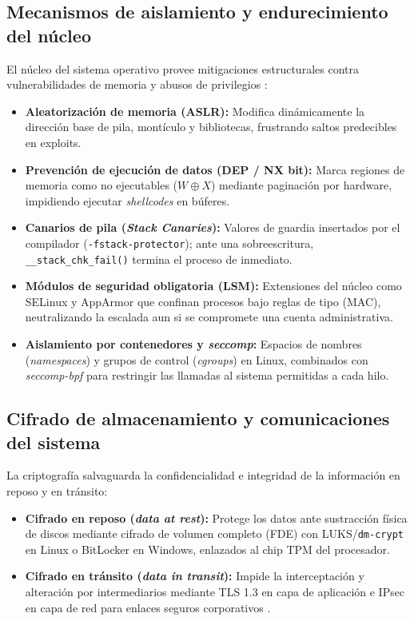 \documentclass[12pt]{article}
\begin{document}
\subsection{Mecanismos de aislamiento y endurecimiento del núcleo}\label{subsec:aislamientoEndurecimientoNucleo}

El núcleo del sistema operativo provee mitigaciones estructurales contra vulnerabilidades de memoria y abusos de privilegios \parencite[\S 15.5, p.\ 683]{stallings2018operating}:
\begin{itemize}[noitemsep, topsep=2pt]
    \item \textbf{Aleatorización de memoria (ASLR):} Modifica dinámicamente la dirección base de pila, montículo y bibliotecas, frustrando saltos predecibles en exploits.
    \item \textbf{Prevención de ejecución de datos (DEP / NX bit):} Marca regiones de memoria como no ejecutables ($W \oplus X$) mediante paginación por hardware, impidiendo ejecutar \textit{shellcodes} en búferes.
    \item \textbf{Canarios de pila (\textit{Stack Canaries}):} Valores de guardia insertados por el compilador (\texttt{-fstack-protector}); ante una sobreescritura, \texttt{\_\_stack\_chk\_fail()} termina el proceso de inmediato.
    \item \textbf{Módulos de seguridad obligatoria (LSM):} Extensiones del núcleo como SELinux y AppArmor que confinan procesos bajo reglas de tipo (MAC), neutralizando la escalada aun si se compromete una cuenta administrativa.
    \item \textbf{Aislamiento por contenedores y \textit{seccomp}:} Espacios de nombres (\textit{namespaces}) y grupos de control (\textit{cgroups}) en Linux, combinados con \textit{seccomp-bpf} para restringir las llamadas al sistema permitidas a cada hilo.
\end{itemize}

\subsection{Cifrado de almacenamiento y comunicaciones del sistema}\label{subsec:cifradoAlmacenamientoComunicaciones}

La criptografía salvaguarda la confidencialidad e integridad de la información en reposo y en tránsito:
\begin{itemize}[noitemsep, topsep=2pt]
    \item \textbf{Cifrado en reposo (\textit{data at rest}):} Protege los datos ante sustracción física de discos mediante cifrado de volumen completo (FDE) con LUKS/\texttt{dm-crypt} en Linux o BitLocker en Windows, enlazados al chip TPM del procesador.
    \item \textbf{Cifrado en tránsito (\textit{data in transit}):} Impide la interceptación y alteración por intermediarios mediante TLS 1.3 en capa de aplicación e IPsec en capa de red para enlaces seguros corporativos \parencite[\S 19.10.2, p.\ 960]{deitel2004operating}.
\end{itemize}
\end{document}
